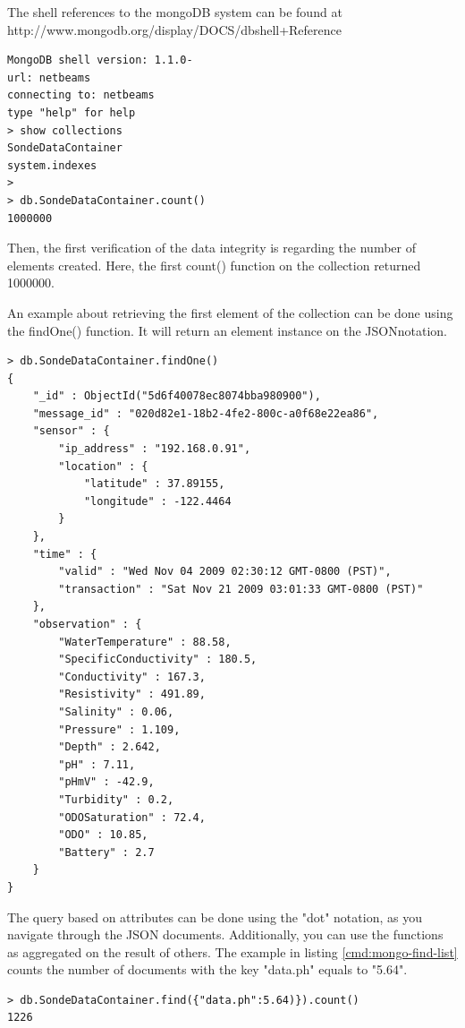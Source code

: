 The shell references to the mongoDB system can be found at
http://www.mongodb.org/display/DOCS/dbshell+Reference 

\lstset{label=cmd:mongo,caption=Execution of mongo client}
\begin{lstlisting}
MongoDB shell version: 1.1.0-
url: netbeams
connecting to: netbeams
type "help" for help
> show collections
SondeDataContainer
system.indexes
>
> db.SondeDataContainer.count()
1000000
\end{lstlisting}

Then, the first verification of the data integrity is regarding the number of
elements created. Here, the first count() function on the collection returned
1000000.

An example about retrieving the first element of the collection can be done
using the findOne() function. It will return an element instance on the
JSONnotation.

\lstset{label=cmd:mongo-findone,caption=Querying the database: one item}
\begin{lstlisting}
> db.SondeDataContainer.findOne()
{
    "_id" : ObjectId("5d6f40078ec8074bba980900"),
    "message_id" : "020d82e1-18b2-4fe2-800c-a0f68e22ea86",
    "sensor" : {
        "ip_address" : "192.168.0.91",
        "location" : {
            "latitude" : 37.89155,
            "longitude" : -122.4464
        }
    },
    "time" : {
        "valid" : "Wed Nov 04 2009 02:30:12 GMT-0800 (PST)",
        "transaction" : "Sat Nov 21 2009 03:01:33 GMT-0800 (PST)"
    },
    "observation" : {
        "WaterTemperature" : 88.58,
        "SpecificConductivity" : 180.5,
        "Conductivity" : 167.3,
        "Resistivity" : 491.89,
        "Salinity" : 0.06,
        "Pressure" : 1.109,
        "Depth" : 2.642,
        "pH" : 7.11,
        "pHmV" : -42.9,
        "Turbidity" : 0.2,
        "ODOSaturation" : 72.4,
        "ODO" : 10.85,
        "Battery" : 2.7
    }
}
\end{lstlisting}

The query based on attributes can be done using the "dot" notation, as you
navigate through the JSON documents. Additionally, you can use the functions as
aggregated on the result of others. The example in listing
\ref{cmd:mongo-find-list} counts the number of documents with the key
"data.ph" equals to "5.64".

\lstset{label=cmd:mongo-find-list,caption=Execution of mongo client}
\begin{lstlisting}
> db.SondeDataContainer.find({"data.ph":5.64)}).count()
1226
\end{lstlisting}

